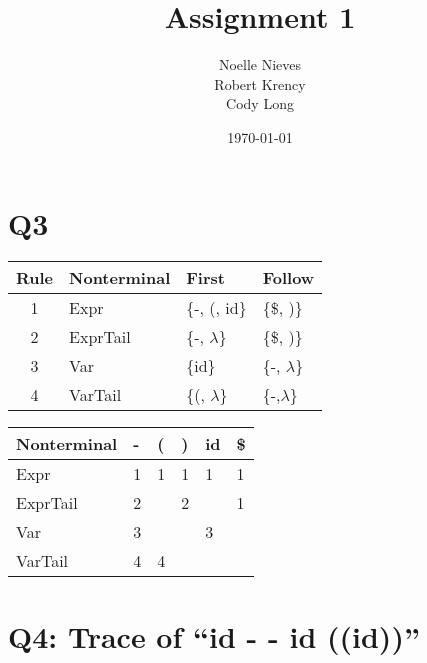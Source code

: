 \documentclass[12pt]{article}
\date{\today}
\author{Noelle Nieves \\ Robert Krency \\ Cody Long }
\title{Assignment 1}
\begin{document}
\maketitle
\thispagestyle{fancy}

\section*{Q3}
    
\begin{tabular}{| c | l | l | l |}
    \hline
    \textbf{Rule} & \textbf{Nonterminal} & \textbf{First} & \textbf{Follow} \\ \hline
    1 & Expr & \{-, (, id\} & \{\$, )\} \\ \hline
    2 & ExprTail & \{-, $\lambda$\} & \{\$, )\} \\ \hline
    3 & Var & \{id\} & \{-, $\lambda$\} \\ \hline
    4 & VarTail & \{(, $\lambda$\} & \{-,$\lambda$\} \\ \hline
\end{tabular}
\vspace{1cm}

\noindent \begin{tabular}{|l|l|l|l|l|l|}
    \hline
    \textbf{Nonterminal} & \textbf{-}\hspace{5mm} & \textbf{(}\hspace{5mm} & \textbf{)}\hspace{5mm} & \textbf{id}\hspace{5mm} & \textbf{\$}\hspace{5mm} \\ \hline
    Expr & 1 & 1 & 1 & 1 & 1 \\ \hline
    ExprTail & 2 & & 2 & & 1 \\ \hline
    Var & 3 & & & 3 & \\ \hline
    VarTail & 4 & 4 & & & \\ \hline
\end{tabular}

\pagebreak
\section*{Q4: Trace of ``id - - id ((id))''}
\end{document}
